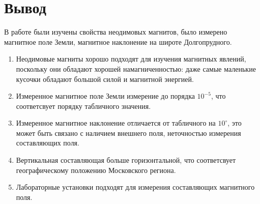 \documentclass[a4paper, 12pt]{article}
\begin{document}
\section*{Вывод}
    В работе были изучены свойства неодимовых магнитов, было измерено магнитное поле Земли, магнитное наклонение на широте Долгопрудного.
    \begin{enumerate}
        \item Неодимовые магниты хорошо подходят для изучения магнитных явлений, поскольку они обладают хорошей намагниченностью: даже самые
        маленькие кусочки обладают большой силой и магнитной энергией.
        \item Измеренное магнитное поле Земли измерение до порядка $10^{-5}$, что соответсвует порядку табличного значения.
        \item Измеренное магнитное наклонение отличается от табличного на $10^{\circ}$, это может быть связано с наличием внешнего поля,
        неточностью измерения составляющих поля.
        \item Вертикальная  составляющая больше горизонтальной, что соответсвует географическому положению Московского региона.
        \item Лабораторные установки подходят для измерения составляющих магнитного поля.
    \end{enumerate}
\end{document}
